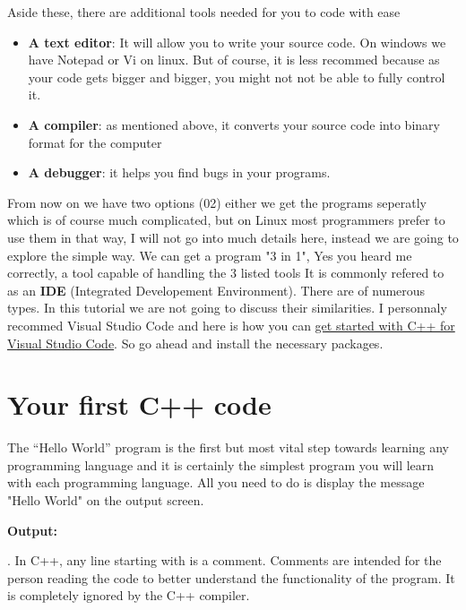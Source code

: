 \documentclass[11pt, a4paper]{article}
\begin{document}
Aside these, there are additional tools needed for you to code with ease
\begin{itemize}
    \item \textbf{A text editor}: It will allow you to write your source
    code. On windows we have Notepad or Vi on linux. But of course, it is
    less recommed because as your code gets bigger and bigger, you might not 
    not be  able to fully control it.
    \item \textbf{A compiler}: as mentioned above, it converts your source code into
    binary format for the computer
    \item \textbf{A debugger}: it helps you find bugs in your programs.
\end{itemize}
From now on we have two options (02) either we get the programs seperatly
which is of course much complicated, but on Linux most programmers prefer 
to use them in that way, I will not go into much details here, instead we 
are going to explore the simple way. We can get a program "3 in 1",
Yes you heard me correctly, a tool capable of handling the 3 listed tools 
It is commonly refered to as an \textbf{IDE} (Integrated Developement Environment).
There are of numerous types. In this tutorial we are not going to discuss 
their similarities. I personnaly recommed Visual Studio Code and here is
how you can \href{https://code.visualstudio.com/docs/languages/cpp}
{get started with C++ for Visual Studio Code}. So go ahead and install the
necessary packages.

\section{Your first C++ code}
The “Hello World” program is the first but most vital step towards
learning any programming language and it is certainly the simplest
program you will learn with each programming language. All you need
to do is display the message "Hello World" on the output screen.


\noindent \textbf{Output:}


. \newline
In C++, any line starting with \fbox{\color{green}//} is a comment. Comments are
intended for the person reading the code to better understand the
functionality of the program. It is completely ignored by the C++
compiler.
\end{document}
